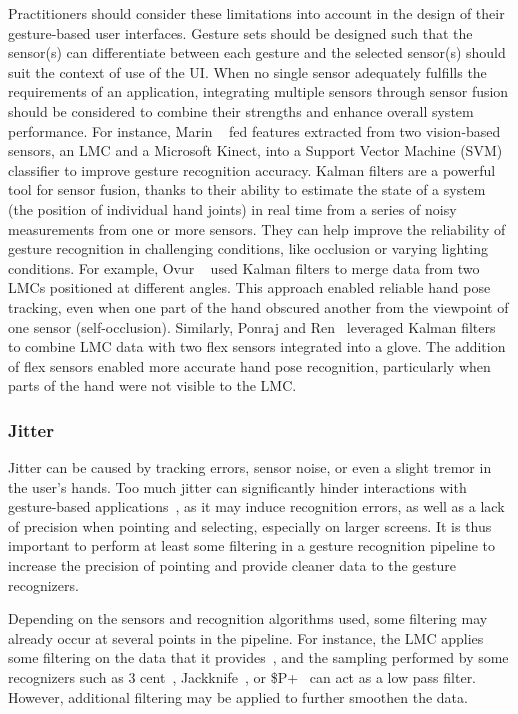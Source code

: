 Practitioners should consider these limitations into account in the design of their gesture-based user interfaces. Gesture sets should be designed such that the sensor(s) can differentiate between each gesture and the selected sensor(s) should suit the context of use of the UI. 
%
When no single sensor adequately fulfills the requirements of an application, integrating multiple sensors through sensor fusion should be considered to combine their strengths and enhance overall system performance. 
%
For instance, Marin \etal~\cite{Marin:2014} fed features extracted from two vision-based sensors, an LMC and a Microsoft Kinect, into a Support Vector Machine (SVM) classifier to improve gesture recognition accuracy. 
%
Kalman filters are a powerful tool for sensor fusion, thanks to their ability to estimate the state of a system (\eg the position of individual hand joints) in real time from a series of noisy measurements from one or more sensors. They can help improve the reliability of gesture recognition in challenging conditions, like occlusion or varying lighting conditions.
%
For example, Ovur \etal~\cite{Ovur:2021} used Kalman filters to merge data from two LMCs positioned at different angles. This approach enabled reliable hand pose tracking, even when one part of the hand obscured another from the viewpoint of one sensor (\ie self-occlusion).
%
Similarly, Ponraj and Ren~\cite{Ponraj:2018} leveraged Kalman filters to combine LMC data with two flex sensors integrated into a glove. The addition of flex sensors enabled more accurate hand pose recognition, particularly when parts of the hand were not visible to the LMC.


\subsubsection{Jitter} \label{sec:state_of_the_art:overview:challenges:jitter}
\label{sec:noise}
Jitter can be caused by tracking errors, sensor noise, or even a slight tremor in the user's hands. Too much jitter can significantly hinder interactions with gesture-based applications~\cite{Pavlovych:2009}, as it may induce recognition errors, as well as a lack of precision when pointing and selecting, especially on larger screens. It is thus important to perform at least some filtering in a gesture recognition pipeline to increase the precision of pointing and provide cleaner data to the gesture recognizers.

Depending on the sensors and recognition algorithms used, some filtering may already occur at several points in the pipeline. For instance, the LMC applies some filtering on the data that it provides~\cite{Colgan:2017}, and the sampling performed by some recognizers such as 3 cent~\cite{Caputo:2017}, Jackknife~\cite{Taranta:2017}, or \$P+~\cite{Vatavu:2017a} can act as a low pass filter. However, additional filtering may be applied to further smoothen the data.

